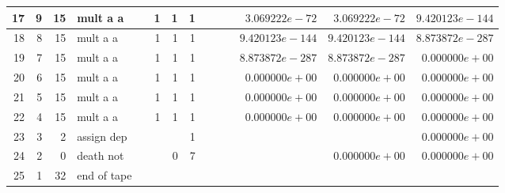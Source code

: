 \documentclass{article}
\begin{document}
\begin{tabular}{|r|r|r|l|r|r|r|r||r|r||r|r|r|r|}
17 & 9 & 15 & mult a a & & 1 & 1 & 1 & & & &$ 3.069222e-72 $&$ 3.069222e-72 $&$ 9.420123e-144 $\\ \hline 
18 & 8 & 15 & mult a a & & 1 & 1 & 1 & & & &$ 9.420123e-144 $&$ 9.420123e-144 $&$ 8.873872e-287 $\\ \hline 
19 & 7 & 15 & mult a a & & 1 & 1 & 1 & & & &$ 8.873872e-287 $&$ 8.873872e-287 $&$ 0.000000e+00 $\\ \hline 
20 & 6 & 15 & mult a a & & 1 & 1 & 1 & & & &$ 0.000000e+00 $&$ 0.000000e+00 $&$ 0.000000e+00 $\\ \hline 
21 & 5 & 15 & mult a a & & 1 & 1 & 1 & & & &$ 0.000000e+00 $&$ 0.000000e+00 $&$ 0.000000e+00 $\\ \hline 
22 & 4 & 15 & mult a a & & 1 & 1 & 1 & & & &$ 0.000000e+00 $&$ 0.000000e+00 $&$ 0.000000e+00 $\\ \hline 
23 & 3 & 2 & assign dep & & & & 1 & & & & & &$ 0.000000e+00 $\\ \hline 
24 & 2 & 0 & death not & & & 0 & 7 & & & & &$ 0.000000e+00 $&$ 0.000000e+00 $\\ \hline 
 25 & 1 & 32 & end of tape & & & & & & & & & &  \\ \hline 
\end{tabular}
\end{document}

